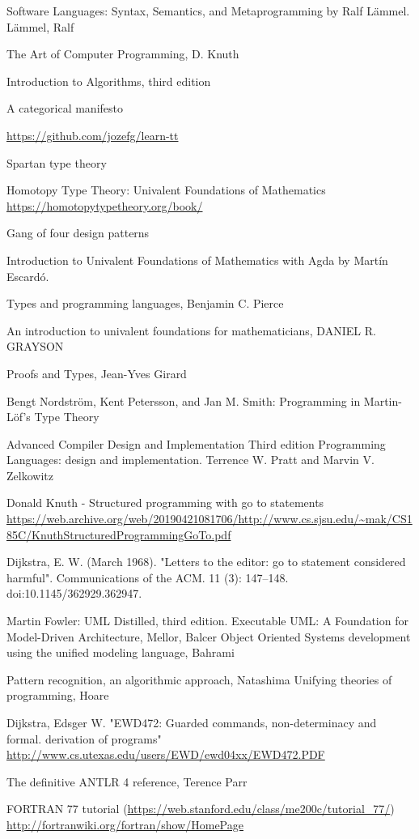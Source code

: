 \documentclass{report}
\begin{document}
 Software Languages: Syntax, Semantics, and Metaprogramming
by Ralf Lämmel.
Lämmel, Ralf

The Art of Computer Programming, D. Knuth

Introduction to Algorithms, third edition

A categorical manifesto

\url{https://github.com/jozefg/learn-tt}

Spartan type theory

Homotopy Type Theory:
Univalent Foundations of Mathematics
\url{https://homotopytypetheory.org/book/}

Gang of four design patterns

Introduction to Univalent Foundations of Mathematics with Agda by Martín Escardó.

Types and programming languages, Benjamin C. Pierce

An introduction to univalent foundations for mathematicians, DANIEL R. GRAYSON

Proofs and Types, Jean-Yves Girard

Bengt Nordström, Kent Petersson, and Jan M. Smith: Programming in Martin-Löf's Type Theory


Advanced Compiler Design and Implementation
Third edition Programming Languages: design and implementation. Terrence W. Pratt and Marvin V. Zelkowitz

Donald Knuth - Structured programming with go to statements \url{https://web.archive.org/web/20190421081706/http://www.cs.sjsu.edu/~mak/CS185C/KnuthStructuredProgrammingGoTo.pdf}

Dijkstra, E. W. (March 1968). "Letters to the editor: go to statement considered harmful". Communications of the ACM. 11 (3): 147–148. doi:10.1145/362929.362947. 

Martin Fowler: UML Distilled, third edition.
Executable UML: A Foundation for Model-Driven Architecture, Mellor, Balcer
Object Oriented Systems development using the unified modeling language, Bahrami

Pattern recognition, an algorithmic approach, Natashima
Unifying theories of programming, Hoare

Dijkstra, Edsger W. "EWD472: Guarded commands, non-determinacy and formal. derivation of programs" \url{http://www.cs.utexas.edu/users/EWD/ewd04xx/EWD472.PDF}

The definitive ANTLR 4 reference, Terence Parr

FORTRAN 77 tutorial (\url{https://web.stanford.edu/class/me200c/tutorial_77/})
\url{http://fortranwiki.org/fortran/show/HomePage}
\end{document}
